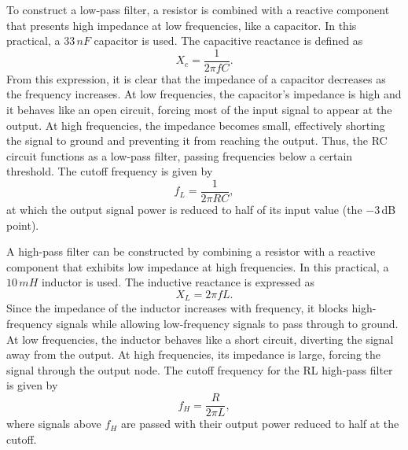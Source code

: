 \documentclass[a4paper, onecolumn, 12pt]{IEEEtran}
\begin{document}
To construct a low-pass filter, a resistor is combined with a reactive component that presents high impedance at low frequencies, like a capacitor. In this practical, a $33\,nF$ capacitor is used. The capacitive reactance is defined as
\begin{equation} \label{X_c}
  X_c = \frac{1}{2 \pi f C}.
\end{equation}
From this expression, it is clear that the impedance of a capacitor decreases as the frequency increases. At low frequencies, the capacitor's impedance is high and it behaves like an open circuit, forcing most of the input signal to appear at the output. At high frequencies, the impedance becomes small, effectively shorting the signal to ground and preventing it from reaching the output. Thus, the RC circuit functions as a low-pass filter, passing frequencies below a certain threshold. The cutoff frequency is given by
\begin{equation}
\label{eqn:rc_cutoff}
f_L = \frac{1}{2\pi RC},
\end{equation}
at which the output signal power is reduced to half of its input value (the $-3\,$dB point).

A high-pass filter can be constructed by combining a resistor with a reactive component that exhibits low impedance at high frequencies. In this practical, a $10\,mH$ inductor is used. The inductive reactance is expressed as
\begin{equation}
\label{eqn:X_L}
X_L = 2 \pi f L.
\end{equation}
Since the impedance of the inductor increases with frequency, it blocks high-frequency signals while allowing low-frequency signals to pass through to ground. At low frequencies, the inductor behaves like a short circuit, diverting the signal away from the output. At high frequencies, its impedance is large, forcing the signal through the output node. The cutoff frequency for the RL high-pass filter is given by
\begin{equation} \label{rl_cutoff}
  f_H = \frac{R}{2 \pi L},
\end{equation}
where signals above $f_H$ are passed with their output power reduced to half at the cutoff.
\end{document}
